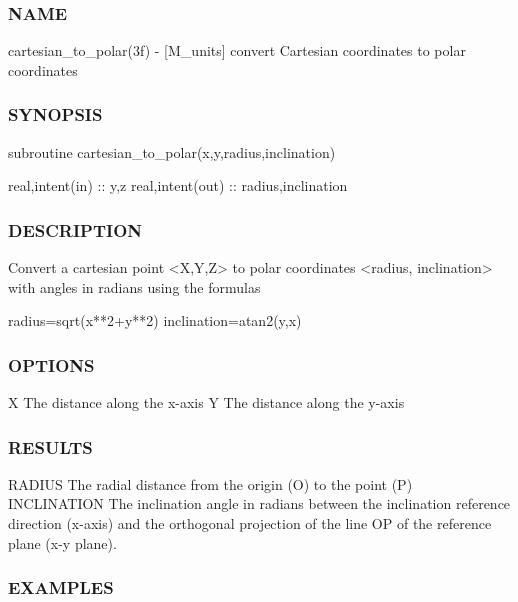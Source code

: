 \subsubsection*{N\+A\+ME}

cartesian\+\_\+to\+\_\+polar(3f) -\/ \mbox{[}M\+\_\+units\mbox{]} convert Cartesian coordinates to polar coordinates \subsubsection*{S\+Y\+N\+O\+P\+S\+IS}

subroutine cartesian\+\_\+to\+\_\+polar(x,y,radius,inclination)

real,intent(in) \+:\+: y,z real,intent(out) \+:\+: radius,inclination

\subsubsection*{D\+E\+S\+C\+R\+I\+P\+T\+I\+ON}

\begin{DoxyVerb} Convert a cartesian point <X,Y,Z> to polar coordinates <radius,
 inclination> with angles in radians using the formulas

   radius=sqrt(x**2+y**2)
   inclination=atan2(y,x)
\end{DoxyVerb}


\subsubsection*{O\+P\+T\+I\+O\+NS}

X The distance along the x-\/axis Y The distance along the y-\/axis

\subsubsection*{R\+E\+S\+U\+L\+TS}

\begin{DoxyVerb}RADIUS       The radial distance from the origin (O) to the point (P)
INCLINATION  The inclination angle in radians between the inclination reference direction
             (x-axis) and the orthogonal projection of the line OP of the
             reference plane (x-y plane).
\end{DoxyVerb}


\subsubsection*{E\+X\+A\+M\+P\+L\+ES}

